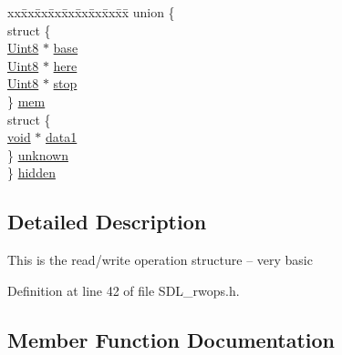 \begin{DoxyCompactItemize}
\begin{tabbing}
xx\=xx\=xx\=xx\=xx\=xx\=xx\=xx\=xx\=\kill
union \{\\
\>struct \{\\
\>\>\hyperlink{_s_d_l__stdinc_8h_a2944638813a090aa23e62f4da842c3e2}{Uint8} $\ast$ \hyperlink{struct_s_d_l___r_wops_af9b489d7342296ce197b911cfa93b2ab}{base}\\
\>\>\hyperlink{_s_d_l__stdinc_8h_a2944638813a090aa23e62f4da842c3e2}{Uint8} $\ast$ \hyperlink{struct_s_d_l___r_wops_a6fc84601c17e347c6ef24c63a79deb57}{here}\\
\>\>\hyperlink{_s_d_l__stdinc_8h_a2944638813a090aa23e62f4da842c3e2}{Uint8} $\ast$ \hyperlink{struct_s_d_l___r_wops_a4108a41afa8b62e75b0f160de4b56103}{stop}\\
\>\} \hyperlink{struct_s_d_l___r_wops_a2610a73a002f6f1eb01996e968034803}{mem}\\
\>struct \{\\
\>\>\hyperlink{_s_d_l__opengl_8h_a3db05964a3cc4410f35b7ea2b7eb850d}{void} $\ast$ \hyperlink{struct_s_d_l___r_wops_ab89d27b4312c0b9d664c81bc92917fc8}{data1}\\
\>\} \hyperlink{struct_s_d_l___r_wops_a91be5f177f5d258abb085fbabc40a0b2}{unknown}\\
\} \hyperlink{struct_s_d_l___r_wops_a8ac2a4e01366f7bb9f41956beffa759d}{hidden}\\

\end{tabbing}\end{DoxyCompactItemize}


\subsection{Detailed Description}
This is the read/write operation structure -- very basic 

Definition at line 42 of file S\+D\+L\+\_\+rwops.\+h.



\subsection{Member Function Documentation}
\hypertarget{struct_s_d_l___r_wops_a25b6f8f86737e5f6af594d4069885771}{}

